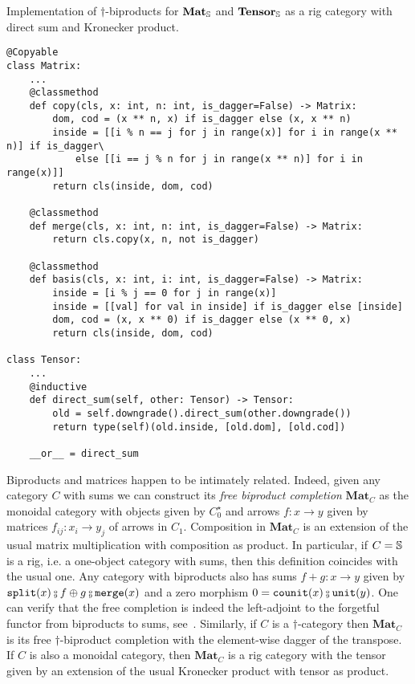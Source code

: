 \begin{python}
{\normalfont Implementation of $\dagger$-biproducts for $\mathbf{Mat}_\S$
and $\mathbf{Tensor}_\S$ as a rig category with direct sum and Kronecker product.}

\begin{verbatim}
@Copyable
class Matrix:
    ...
    @classmethod
    def copy(cls, x: int, n: int, is_dagger=False) -> Matrix:
        dom, cod = (x ** n, x) if is_dagger else (x, x ** n)
        inside = [[i % n == j for j in range(x)] for i in range(x ** n)] if is_dagger\
            else [[i == j % n for j in range(x ** n)] for i in range(x)]]
        return cls(inside, dom, cod)

    @classmethod
    def merge(cls, x: int, n: int, is_dagger=False) -> Matrix:
        return cls.copy(x, n, not is_dagger)

    @classmethod
    def basis(cls, x: int, i: int, is_dagger=False) -> Matrix:
        inside = [i % j == 0 for j in range(x)]
        inside = [[val] for val in inside] if is_dagger else [inside]
        dom, cod = (x, x ** 0) if is_dagger else (x ** 0, x)
        return cls(inside, dom, cod)

class Tensor:
    ...
    @inductive
    def direct_sum(self, other: Tensor) -> Tensor:
        old = self.downgrade().direct_sum(other.downgrade())
        return type(self)(old.inside, [old.dom], [old.cod])

    __or__ = direct_sum
\end{verbatim}
\end{python}

Biproducts and matrices happen to be intimately related.
Indeed, given any category $C$ with sums we can construct its \emph{free biproduct completion} $\mathbf{Mat}_C$ as the monoidal category with objects given by $C_0^\star$ and arrows $f : x \to y$ given by matrices $f_{ij} : x_i \to y_j$ of arrows in $C_1$.
Composition in $\mathbf{Mat}_C$ is an extension of the usual matrix multiplication with composition as product.
In particular, if $C = \S$ is a rig, i.e. a one-object category with sums, then this definition coincides with the usual one.
Any category with biproducts also has sums $f + g : x \to y$ given by $\ttsplit(x) \fcmp f \oplus g \fcmp \merge(x)$ and a zero morphism $0 = \counit(x) \fcmp \unit(y)$.
One can verify that the free completion is indeed the left-adjoint to the forgetful functor from biproducts to sums, see~\cite[Exercise VIII.2.6]{MacLane71}.
Similarly, if $C$ is a $\dagger$-category then $\mathbf{Mat}_C$ is its free $\dagger$-biproduct completion with the element-wise dagger of the transpose.
If $C$ is also a monoidal category, then $\mathbf{Mat}_C$ is a rig category with the tensor given by an extension of the usual Kronecker product with tensor as product.


